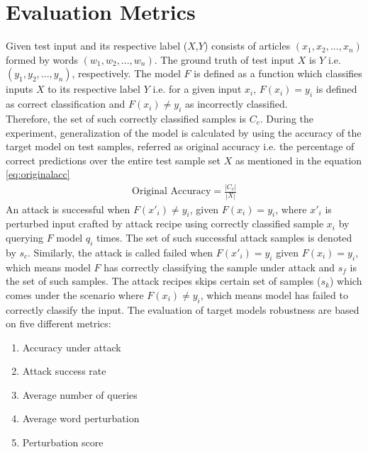 \documentclass[%
	BCOR=8mm, %
	DIV=12,
	toc=bibliography, %
	toc=listof, %
	oneside, %
	egregdoesnotlikesansseriftitles, %
	]{scrbook}
\begin{document}
\section{Evaluation Metrics}
\label{section:metrics}
Given test input and its respective label ($X$,$Y$) consists of articles $(x_{1},x_{2},...,x_{n})$ formed by words $(w_{1},w_{2},...,w_{n})$. The ground truth of test input $X$ is $Y$ i.e. $(y_{1},y_{2},...,y_{n})$, respectively. The model $F$ is defined as a function which classifies inputs $X$ to its respective label $Y$ i.e. for a given input $x_{i}$, $F(x_{i})=y_{i}$ is defined as correct classification and $F(x_{i})\not=y_{i}$  as incorrectly classified. \\
Therefore, the set of such correctly classified samples is  $C_{c}$.  During the experiment, generalization of the model is calculated by using the accuracy of the target model on test samples, referred as original accuracy i.e. the percentage of correct predictions over the entire test sample set $X$ as mentioned in the equation \ref{eq:originalacc} \\
 \begin{equation}
    \begin{aligned}
        \mbox{Original Accuracy}=\frac{|C_{c}|}{|X|} 
        \label{eq:originalacc}
    \end{aligned}
\end{equation}
An attack is successful when $F(x'_{i})\not=y_{i}$, given $F(x_{i})=y_{i}$, where $x'_{i}$ is perturbed input crafted by attack recipe using correctly classified sample $x_{i}$ by querying $F$ model $q_{i}$ times. The set of such successful attack samples is denoted by $s_{c}$. Similarly, the attack is called failed when $F(x'_{i})=y_{i}$ given $F(x_{i})=y_{i}$, which means model $F$ has correctly classifying the sample under attack and $s_{f}$ is the set of such samples. The attack recipes skips certain set of samples ($s_{k}$) which comes under the scenario where  $F(x_{i})\not=y_{i}$,  which means model has failed to correctly classify the input. The evaluation of target models robustness are based on five different metrics: 
\begin{enumerate}
    \item Accuracy under attack 
    \item Attack success rate
    \item Average number of queries
    \item Average word perturbation 
    \item Perturbation score
\end{enumerate}
\end{document}
